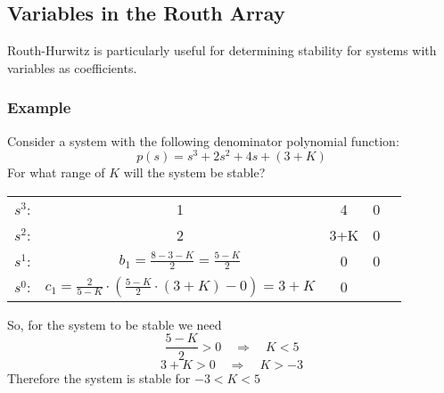 \documentclass{book}
\newcommand{\exmp}{\subsubsection*{Example}}
\begin{document}
\subsection*{Variables in the Routh Array}
Routh-Hurwitz is particularly useful for determining stability for systems with variables as coefficients.
\exmp
Consider a system with the following denominator polynomial function:
\[ p(s) = s^3 + 2s^2 + 4s + (3+K) \]
For what range of $ K $ will the system be stable?
\begin{center}
	\begin{tabular}{c c c c l}\vspace{1em}
		$ s^3 $: &  1 & 4 & 0 & \\ \vspace{1em}
		$ s^2 $: & 2 & 3+K & 0 & \\ \vspace{1em}
		$ s^1 $: & $ b_1=\frac{8-3-K}{2}=\frac{5-K}{2} $ & 0 & 0 & \\ \vspace{1em}
		$ s^0 $: & $ c_1=\frac{2}{5-K}\cdot\left(\frac{5-K}{2}\cdot(3+K)-0\right) = 3+K $ & 0& &
	\end{tabular}
\end{center}
So, for the system to be stable we need
\[ \frac{5-K}{2} > 0 \quad\Rightarrow\quad K<5 \]
\[ 3+K > 0 \quad\Rightarrow\quad K>-3 \]
Therefore the system is stable for $ -3<K<5 $
\end{document}
